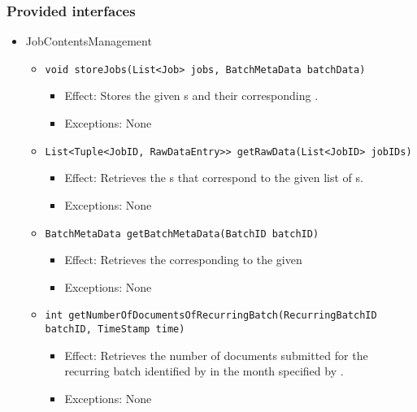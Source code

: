 \subsubsection*{Provided interfaces}
\begin{itemize}
    \item JobContentsManagement
    \begin{itemize}
        \item \texttt{void storeJobs(List<Job> jobs, BatchMetaData batchData)}
        \begin{itemize}
            \item Effect: Stores the given s and their corresponding .
            \item Exceptions: None
        \end{itemize}

		\item \texttt{List<Tuple<JobID, RawDataEntry>> getRawData(List<JobID> jobIDs)}
        \begin{itemize}
            \item Effect: Retrieves the s that correspond to the given list of s.
            \item Exceptions: None
        \end{itemize}

        \item \texttt{BatchMetaData getBatchMetaData(BatchID batchID)}
		\begin{itemize}
            \item Effect: Retrieves the  corresponding to the given 
            \item Exceptions: None
        \end{itemize}

		\item \texttt{int getNumberOfDocumentsOfRecurringBatch(RecurringBatchID batchID, TimeStamp time)}
		\begin{itemize}
            \item Effect: Retrieves the number of documents submitted for the recurring batch identified by  in the month specified by .
            \item Exceptions: None
        \end{itemize}


\end{itemize}
\end{itemize}
